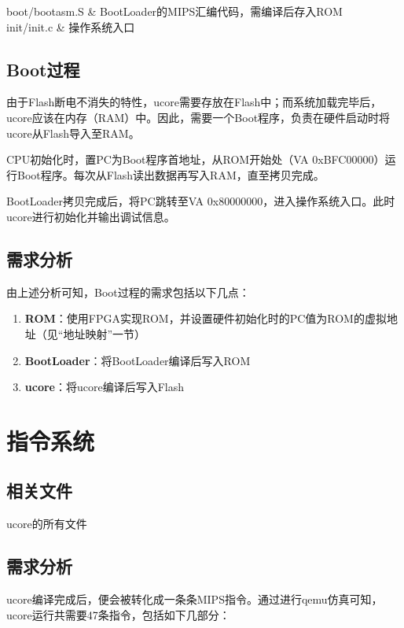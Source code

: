     boot/bootasm.S & BootLoader的MIPS汇编代码，需编译后存入ROM \\
    init/init.c & 操作系统入口 \\
\tableend

\subsection{Boot过程}


由于Flash断电不消失的特性，ucore需要存放在Flash中；而系统加载完毕后，ucore应该在内存（RAM）中。因此，需要一个Boot程序，负责在硬件启动时将ucore从Flash导入至RAM。

CPU初始化时，置PC为Boot程序首地址，从ROM开始处（VA 0xBFC00000）运行Boot程序。每次从Flash读出数据再写入RAM，直至拷贝完成。

BootLoader拷贝完成后，将PC跳转至VA 0x80000000，进入操作系统入口。此时ucore进行初始化并输出调试信息。

\subsection{需求分析}

由上述分析可知，Boot过程的需求包括以下几点：

\begin{enumerate}
    \item {\bf ROM}：使用FPGA实现ROM，并设置硬件初始化时的PC值为ROM的虚拟地址（见``地址映射''一节）
    \item {\bf BootLoader}：将BootLoader编译后写入ROM
    \item {\bf ucore}：将ucore编译后写入Flash
\end{enumerate}

\section{指令系统}

\subsection{相关文件}

ucore的所有文件

\subsection{需求分析}

ucore编译完成后，便会被转化成一条条MIPS指令。通过进行qemu仿真可知，ucore运行共需要47条指令，包括如下几部分：

